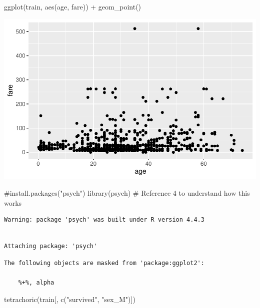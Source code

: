 \documentclass[
  letterpaper,
  DIV=11,
  numbers=noendperiod]{scrartcl}
\newenvironment{Shaded}{\begin{snugshade}}{\end{snugshade}}
\newcommand{\CommentTok}[1]{\textcolor[rgb]{0.37,0.37,0.37}{#1}}
\newcommand{\FunctionTok}[1]{\textcolor[rgb]{0.28,0.35,0.67}{#1}}
\newcommand{\NormalTok}[1]{\textcolor[rgb]{0.00,0.23,0.31}{#1}}
\newcommand{\SpecialCharTok}[1]{\textcolor[rgb]{0.37,0.37,0.37}{#1}}
\newcommand{\StringTok}[1]{\textcolor[rgb]{0.13,0.47,0.30}{#1}}
\begin{document}
\begin{Shaded}
\begin{Highlighting}[]
\FunctionTok{ggplot}\NormalTok{(train, }\FunctionTok{aes}\NormalTok{(age, fare)) }\SpecialCharTok{+}
  \FunctionTok{geom\_point}\NormalTok{()}
\end{Highlighting}
\end{Shaded}

\includegraphics{FinalProject_files/figure-pdf/unnamed-chunk-10-5.pdf}

\begin{Shaded}
\begin{Highlighting}[]
\CommentTok{\#install.packages("psych")}
\FunctionTok{library}\NormalTok{(psych) }\CommentTok{\# Reference 4 to understand how this works}
\end{Highlighting}
\end{Shaded}

\begin{verbatim}
Warning: package 'psych' was built under R version 4.4.3
\end{verbatim}

\begin{verbatim}

Attaching package: 'psych'
\end{verbatim}

\begin{verbatim}
The following objects are masked from 'package:ggplot2':

    %+%, alpha
\end{verbatim}

\begin{Shaded}
\begin{Highlighting}[]
\FunctionTok{tetrachoric}\NormalTok{(train[, }\FunctionTok{c}\NormalTok{(}\StringTok{"survived"}\NormalTok{, }\StringTok{"sex\_M"}\NormalTok{)])}
\end{Highlighting}
\end{Shaded}
\end{document}
